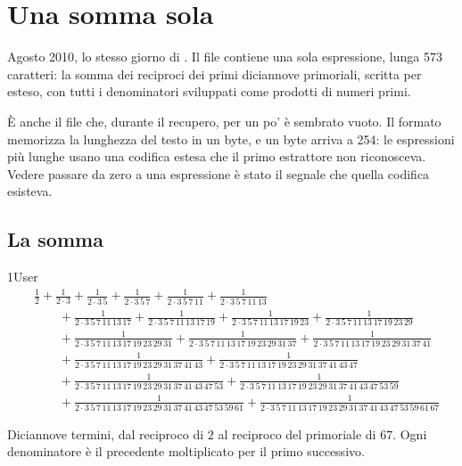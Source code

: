 \chapter{Una somma sola}
\label{cap:numeri-primi}

Agosto 2010, lo stesso giorno di . Il file contiene una sola espressione, lunga 573 caratteri: la somma dei reciproci dei primi diciannove primoriali, scritta per esteso, con tutti i denominatori sviluppati come prodotti di numeri primi.

È anche il file che, durante il recupero, per un po' è sembrato vuoto. Il formato  memorizza la lunghezza del testo in un byte, e un byte arriva a 254: le espressioni più lunghe usano una codifica estesa che il primo estrattore non riconosceva. Vedere  passare da zero a una espressione è stato il segnale che quella codifica esisteva.

\section{La somma}
\begin{espr}{1}{User}{}
\begin{align*}
& \frac{1}{2} + \frac{1}{2 \cdot 3} + \frac{1}{2 \cdot 3\, 5} + \frac{1}{2 \cdot 3\, 5\, 7} + \frac{1}{2 \cdot 3\, 5\, 7\, 11} + \frac{1}{2 \cdot 3\, 5\, 7\, 11\, 13} \\
&\qquad + \frac{1}{2 \cdot 3\, 5\, 7\, 11\, 13\, 17} + \frac{1}{2 \cdot 3\, 5\, 7\, 11\, 13\, 17\, 19} + \frac{1}{2 \cdot 3\, 5\, 7\, 11\, 13\, 17\, 19\, 23} + \frac{1}{2 \cdot 3\, 5\, 7\, 11\, 13\, 17\, 19\, 23\, 29} \\
&\qquad + \frac{1}{2 \cdot 3\, 5\, 7\, 11\, 13\, 17\, 19\, 23\, 29\, 31} + \frac{1}{2 \cdot 3\, 5\, 7\, 11\, 13\, 17\, 19\, 23\, 29\, 31\, 37} + \frac{1}{2 \cdot 3\, 5\, 7\, 11\, 13\, 17\, 19\, 23\, 29\, 31\, 37\, 41} \\
&\qquad + \frac{1}{2 \cdot 3\, 5\, 7\, 11\, 13\, 17\, 19\, 23\, 29\, 31\, 37\, 41\, 43} + \frac{1}{2 \cdot 3\, 5\, 7\, 11\, 13\, 17\, 19\, 23\, 29\, 31\, 37\, 41\, 43\, 47} \\
&\qquad + \frac{1}{2 \cdot 3\, 5\, 7\, 11\, 13\, 17\, 19\, 23\, 29\, 31\, 37\, 41\, 43\, 47\, 53} + \frac{1}{2 \cdot 3\, 5\, 7\, 11\, 13\, 17\, 19\, 23\, 29\, 31\, 37\, 41\, 43\, 47\, 53\, 59} \\
&\qquad + \frac{1}{2 \cdot 3\, 5\, 7\, 11\, 13\, 17\, 19\, 23\, 29\, 31\, 37\, 41\, 43\, 47\, 53\, 59\, 61} + \frac{1}{2 \cdot 3\, 5\, 7\, 11\, 13\, 17\, 19\, 23\, 29\, 31\, 37\, 41\, 43\, 47\, 53\, 59\, 61\, 67}
\end{align*}
\end{espr}
Diciannove termini, dal reciproco di $2$ al reciproco del primoriale di $67$. Ogni denominatore è il precedente moltiplicato per il primo successivo.

